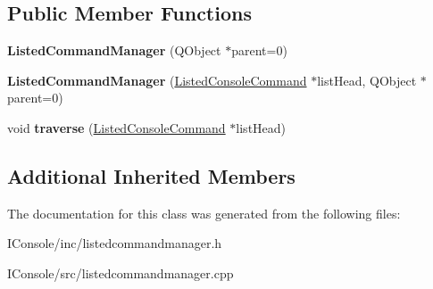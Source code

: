 \subsection*{Public Member Functions}
\begin{DoxyCompactItemize}
\item 
\hypertarget{class_listed_command_manager_aeccd51549559c51c5e0e3b3e38c732e0}{{\bfseries Listed\-Command\-Manager} (Q\-Object $\ast$parent=0)}\label{class_listed_command_manager_aeccd51549559c51c5e0e3b3e38c732e0}

\item 
\hypertarget{class_listed_command_manager_a0d7559e6b7f8040dbcf58c6593e9f23c}{{\bfseries Listed\-Command\-Manager} (\hyperlink{class_listed_console_command}{Listed\-Console\-Command} $\ast$list\-Head, Q\-Object $\ast$parent=0)}\label{class_listed_command_manager_a0d7559e6b7f8040dbcf58c6593e9f23c}

\item 
\hypertarget{class_listed_command_manager_af10a37f7cd4adb7396e0a84f553aff21}{void {\bfseries traverse} (\hyperlink{class_listed_console_command}{Listed\-Console\-Command} $\ast$list\-Head)}\label{class_listed_command_manager_af10a37f7cd4adb7396e0a84f553aff21}

\end{DoxyCompactItemize}
\subsection*{Additional Inherited Members}


The documentation for this class was generated from the following files\-:\begin{DoxyCompactItemize}
\item 
I\-Console/inc/listedcommandmanager.\-h\item 
I\-Console/src/listedcommandmanager.\-cpp\end{DoxyCompactItemize}

